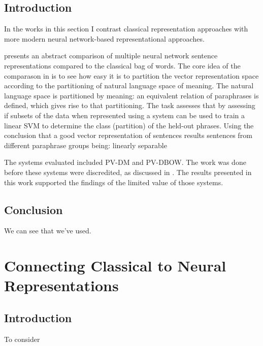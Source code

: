 \documentclass{book}
\begin{document}
\chapter{Introduction}
In the works in this section I contrast classical representation approaches with more modern neural network-based representational approaches.

 presents an abstract comparison of multiple neural network sentence representations compared to the classical bag of words.
The core idea of the comparason in  is to see how easy it is to partition the vector representation space according to the partitioning of natural language space of meaning.
The natural language space is partitioned by meaning: an equivalent relation of paraphrases is defined, which gives rise to that partitioning.
The task assesses that by assessing if subsets of the data when represented using a system can be used to train a linear SVM to determine the class (partition) of the held-out phrases.
Using the conclusion that a good vector representation of sentences results sentences from different paraphrase groups being:
linearly separable



The systems evaluated included PV-DM and PV-DBOW.
The work was done before these systems were discredited, 
as discussed in .
The results presented in this work supported the findings of the limited value of those systems.




\label{SentVecMeaning}





\chapter{Conclusion}
We can see that we've used.


\part{Connecting Classical to Neural Representations}


\chapter{Introduction}
To consider
\end{document}

